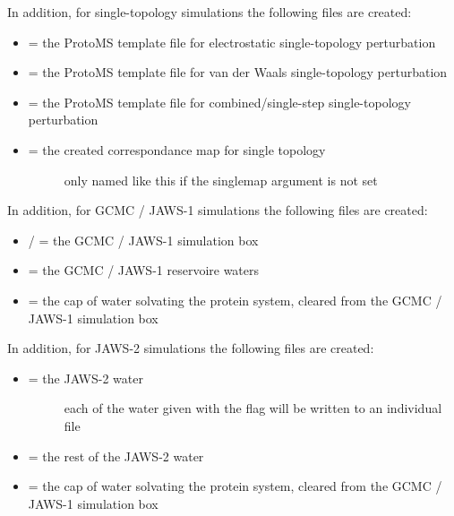 \documentclass[letterpaper,10pt,english]{sphinxmanual}
\begin{document}
In addition, for single-topology simulations the following files are created:
\begin{itemize}
\item {} 
 = the ProtoMS template file for electrostatic single-topology perturbation

\item {} 
 = the ProtoMS template file for van der Waals single-topology perturbation

\item {} 
 = the ProtoMS template file for combined/single-step single-topology perturbation

\item {} \begin{description}
\item[{ = the created correspondance map for single topology}] \leavevmode
only named like this if the \textendash{}singlemap argument is not set

\end{description}

\end{itemize}

In addition, for GCMC / JAWS-1 simulations the following files are created:
\begin{itemize}
\item {} 
 /  = the GCMC / JAWS-1 simulation box

\item {} 
 = the GCMC / JAWS-1 reservoire waters

\item {} 
 = the cap of water solvating the protein system, cleared from the GCMC / JAWS-1 simulation box

\end{itemize}

In addition, for JAWS-2 simulations the following files are created:
\begin{itemize}
\item {} \begin{description}
\item[{ = the JAWS-2 water}] \leavevmode
each of the water given with the  flag will be written to an individual file

\end{description}

\item {} 
 = the rest of the JAWS-2 water

\item {} 
 = the cap of water solvating the protein system, cleared from the GCMC / JAWS-1 simulation box

\end{itemize}
\end{document}
